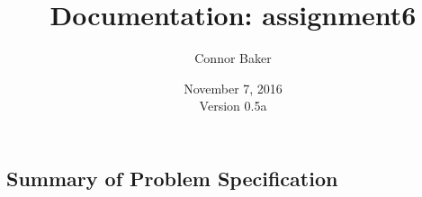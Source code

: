 \documentclass[12pt]{article}
\begin{document}
\null
\nointerlineskip 
\vfill
\let \snewpage \newpage
\let \newpage \relax
    \title{Documentation: assignment6}
    \author{Connor Baker}
    \date{November 7, 2016\\Version 0.5a}
\maketitle
\let \newpage \snewpage
\vfill



\newpage %



\makeatletter
\renewcommand*\l@section{\@dottedtocline{1}{0em}{1.5em}}
\makeatother

\tableofcontents
\clearpage

\begin{center}
\section{Summary of Problem Specification}
\end{center}
\end{document}
